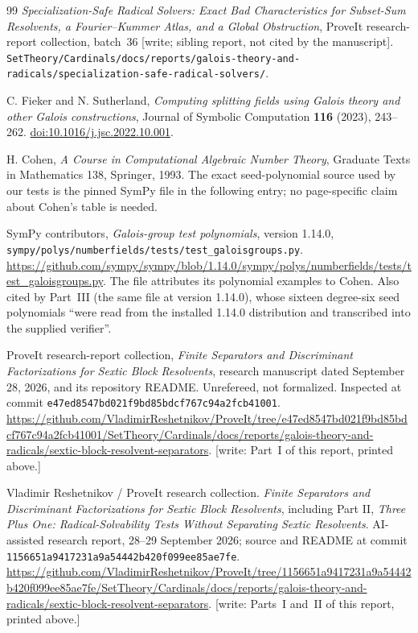 \documentclass[11pt,letterpaper]{article}
\numberwithin{equation}{section}
\theoremstyle{definition}
\theoremstyle{remark}
\newcommand{\src}[1]{\texttt{\nolinkurl{#1}}}
\newcommand{\tpopin}{\texttt{e47ed8547bd021f9bd85bdcf767c94a2fcb41001}}
\newcommand{\zptpin}{\texttt{1156651a9417231a9a54442b420f099ee85ae7fe}}
\begin{document}
\begin{thebibliography}{99}
\emph{Specialization-Safe Radical Solvers: Exact Bad Characteristics for
Subset-Sum Resolvents, a Fourier--Kummer Atlas, and a Global Obstruction},
ProveIt research-report collection, batch~36 [write; sibling report, not
cited by the manuscript].
\src{SetTheory/Cardinals/docs/reports/galois-theory-and-radicals/specialization-safe-radical-solvers/}.

C. Fieker and N. Sutherland,
\emph{Computing splitting fields using Galois theory and other Galois constructions},
Journal of Symbolic Computation \textbf{116} (2023), 243--262.
\href{https://doi.org/10.1016/j.jsc.2022.10.001}{doi:10.1016/j.jsc.2022.10.001}.

H. Cohen,
\emph{A Course in Computational Algebraic Number Theory},
Graduate Texts in Mathematics 138, Springer, 1993.
The exact seed-polynomial source used by our tests is the pinned SymPy file
in the following entry; no page-specific claim about Cohen's table is needed.

SymPy contributors,
\emph{Galois-group test polynomials}, version 1.14.0,
\src{sympy/polys/numberfields/tests/test_galoisgroups.py}.
\url{https://github.com/sympy/sympy/blob/1.14.0/sympy/polys/numberfields/tests/test_galoisgroups.py}.
The file attributes its polynomial examples to Cohen.
Also cited by Part~III (the same file at version 1.14.0), whose sixteen
degree-six seed polynomials ``were read from the installed 1.14.0
distribution and transcribed into the supplied verifier''.

ProveIt research-report collection,
\emph{Finite Separators and Discriminant Factorizations for Sextic Block Resolvents},
research manuscript dated September 28, 2026, and its repository README.
Unrefereed, not formalized. Inspected at commit \tpopin.
\url{https://github.com/VladimirReshetnikov/ProveIt/tree/e47ed8547bd021f9bd85bdcf767c94a2fcb41001/SetTheory/Cardinals/docs/reports/galois-theory-and-radicals/sextic-block-resolvent-separators}.
[write: Part~I of this report, printed above.]

Vladimir Reshetnikov / ProveIt research collection.
\emph{Finite Separators and Discriminant Factorizations for Sextic Block
Resolvents}, including Part II, \emph{Three Plus One:
Radical-Solvability Tests Without Separating Sextic Resolvents}.
AI-assisted research report, 28--29 September 2026; source and README at
commit \zptpin.
\url{https://github.com/VladimirReshetnikov/ProveIt/tree/1156651a9417231a9a54442b420f099ee85ae7fe/SetTheory/Cardinals/docs/reports/galois-theory-and-radicals/sextic-block-resolvent-separators}.
[write: Parts~I and~II of this report, printed above.]


\end{thebibliography}
\end{document}

